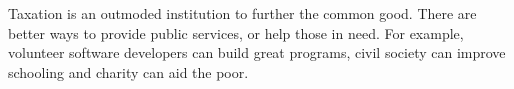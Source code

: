 Taxation is an outmoded institution to further the common good. There are better ways to provide public services, or help those in need. For example, volunteer software developers can build great programs, civil society can improve schooling and charity can aid the poor.
